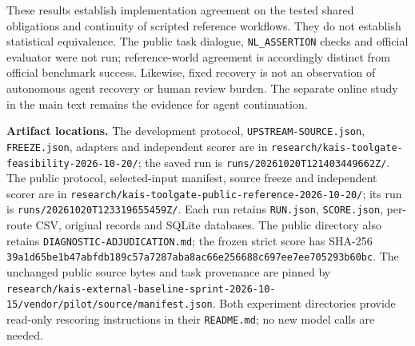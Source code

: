 \documentclass[10pt,a4paper]{article}
\begin{document}
These results establish implementation agreement on the tested shared obligations and continuity of scripted reference workflows. They do not establish statistical equivalence. The public task dialogue, \texttt{NL\_ASSERTION} checks and official evaluator were not run; reference-world agreement is accordingly distinct from official benchmark success. Likewise, fixed recovery is not an observation of autonomous agent recovery or human review burden. The separate online study in the main text remains the evidence for agent continuation.

\textbf{Artifact locations.}
The development protocol, \texttt{UPSTREAM-SOURCE.json}, \texttt{FREEZE.json}, adapters and independent scorer are in \nolinkurl{research/kais-toolgate-feasibility-2026-10-20/}; the saved run is \nolinkurl{runs/20261020T121403449662Z/}. The public protocol, selected-input manifest, source freeze and independent scorer are in \nolinkurl{research/kais-toolgate-public-reference-2026-10-20/}; its run is \nolinkurl{runs/20261020T123319655459Z/}. Each run retains \texttt{RUN.json}, \texttt{SCORE.json}, per-route CSV, original records and SQLite databases. The public directory also retains \texttt{DIAGNOSTIC-ADJUDICATION.md}; the frozen strict score has SHA-256 \nolinkurl{39a1d65be1b47abfdb189c57a7287aba8ac66e256688c697ee7ee705293b60bc}. The unchanged public source bytes and task provenance are pinned by \nolinkurl{research/kais-external-baseline-sprint-2026-10-15/vendor/pilot/source/manifest.json}. Both experiment directories provide read-only rescoring instructions in their \texttt{README.md}; no new model calls are needed.

\clearpage


\end{document}
